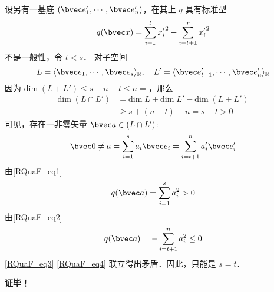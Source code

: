 设另有一基底 $(\bvec e'_1,\cdots,\bvec e'_n)$，在其上 $q$ 具有标准型
\begin{equation}\label{RQuaF_eq2}
q(\bvec x)=\sum_{i=1}^{t}{x'_i}^2-\sum_{i=t+1}^{r} {x'_{i}}^{2}
\end{equation}
不是一般性，令 $t<s$．
对子空间
\begin{equation}
L=\langle \bvec e_1,\cdots,\bvec e_s\rangle_\mathbb{R},\quad L'=\langle \bvec e'_{t+1},\cdots,\bvec e'_n\rangle_\mathbb{R}
\end{equation}
因为 $\mathrm{dim}\;(L+L')\leq s+n-t\leq n=$，那么
\begin{equation}
\begin{aligned}
\mathrm{dim}\;(L\cap L')&=\mathrm{dim}\; L+\mathrm{dim}\; L'-\mathrm{dim}\;(L+L')\\
&\geq s+(n-t)-n=s-t> 0
\end{aligned}
\end{equation}
可见，存在一非零矢量 $\bvec a\in(L\cap L')$:
\begin{equation}
\bvec 0\neq a=\sum_{i=1}^s a_i\bvec e_i=\sum_{i=t+1}^n a'_i \bvec e'_i
\end{equation}
由\autoref{RQuaF_eq1} 
\begin{equation}\label{RQuaF_eq3}
q(\bvec a)=\sum_{i=1}^s a_i^2>0
\end{equation}
由\autoref{RQuaF_eq2} 
\begin{equation}\label{RQuaF_eq4}
q(\bvec a)=-\sum_{i=t+1}^n a_i^2\leq 0
\end{equation}
\autoref{RQuaF_eq3} \autoref{RQuaF_eq4} 联立得出矛盾．因此，只能是 $s=t$．

\textbf{证毕！}

